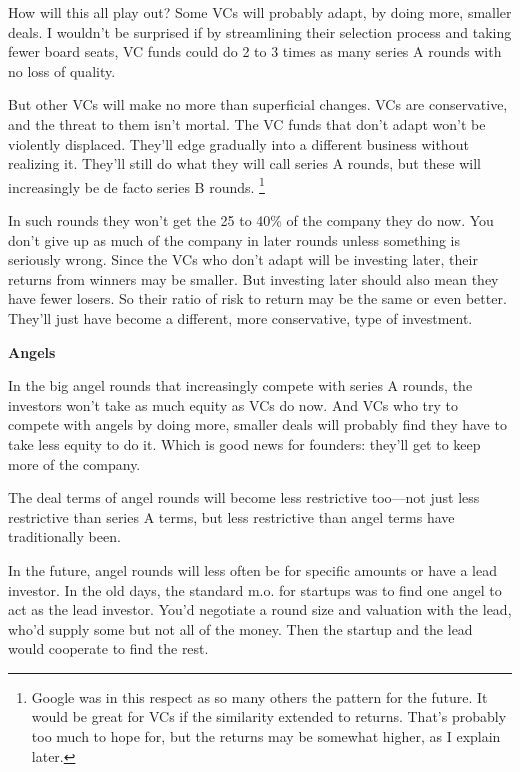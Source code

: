 \documentclass[12pt]{book}
\begin{document}
How will this all play out? Some VCs will probably adapt, by doing more,
smaller deals. I wouldn't be surprised if by streamlining their
selection process and taking fewer board seats, VC funds could do 2 to 3
times as many series A rounds with no loss of quality.

But other VCs will make no more than superficial changes. VCs are
conservative, and the threat to them isn't mortal. The VC funds that
don't adapt won't be violently displaced. They'll edge gradually into a
different business without realizing it. They'll still do what they will
call series A rounds, but these will increasingly be de facto series B
rounds. \footnote{Google was in this respect as so many others the pattern for the
future. It would be great for VCs if the similarity extended to returns.
That's probably too much to hope for, but the returns may be somewhat
higher, as I explain later.}

In such rounds they won't get the 25 to 40\% of the company they do now.
You don't give up as much of the company in later rounds unless
something is seriously wrong. Since the VCs who don't adapt will be
investing later, their returns from winners may be smaller. But
investing later should also mean they have fewer losers. So their ratio
of risk to return may be the same or even better. They'll just have
become a different, more conservative, type of investment.

\textbf{Angels}

In the big angel rounds that increasingly compete with series A rounds,
the investors won't take as much equity as VCs do now. And VCs who try
to compete with angels by doing more, smaller deals will probably find
they have to take less equity to do it. Which is good news for founders:
they'll get to keep more of the company.

The deal terms of angel rounds will become less restrictive too---not
just less restrictive than series A terms, but less restrictive than
angel terms have traditionally been.

In the future, angel rounds will less often be for specific amounts or
have a lead investor. In the old days, the standard m.o. for startups
was to find one angel to act as the lead investor. You'd negotiate a
round size and valuation with the lead, who'd supply some but not all of
the money. Then the startup and the lead would cooperate to find the
rest.
\end{document}
